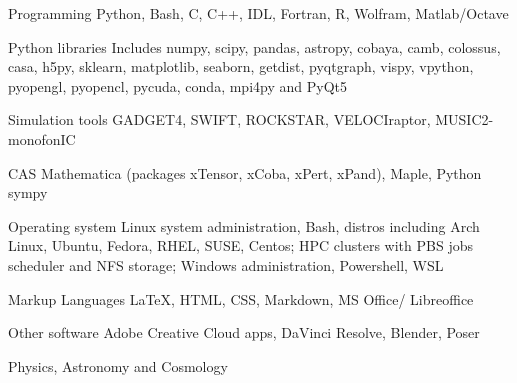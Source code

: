 



\begin{cvskills}

\cvskill
{Programming} %
{ Python, Bash, C, C++, IDL, Fortran, R, Wolfram, Matlab/Octave
} %

\cvskill
{Python libraries}
{Includes numpy, scipy, pandas, astropy, cobaya, camb, colossus, casa, h5py, sklearn, matplotlib, seaborn, \break getdist, pyqtgraph, vispy, vpython, pyopengl, pyopencl, pycuda, conda, mpi4py and PyQt5}

\cvskill
{Simulation tools}
{GADGET4, SWIFT, ROCKSTAR, VELOCIraptor, MUSIC2-monofonIC}

\cvskill
{CAS}
{Mathematica (packages xTensor, xCoba, xPert, xPand), Maple, Python sympy}

\cvskill
{Operating system}
{Linux system administration, Bash, distros including Arch Linux, Ubuntu, Fedora, RHEL, SUSE, Centos; \break HPC clusters with PBS jobs scheduler and NFS storage; Windows administration, Powershell, WSL}

\cvskill
{Markup Languages}
{LaTeX, HTML, CSS, Markdown, MS Office/ Libreoffice}

\cvskill
{Other software} %
{Adobe Creative Cloud apps, DaVinci Resolve, Blender, Poser} %




\end{cvskills}


\begin{cvskills}

\cvskill
{Physics, Astronomy and Cosmology}
{}

\end{cvskills}